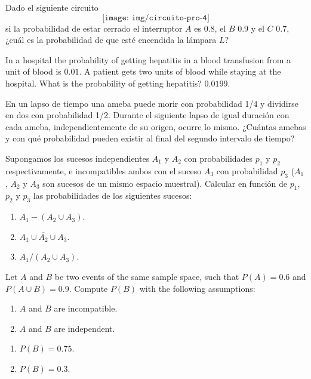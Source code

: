 {Dado el siguiente circuito
\[
\texttt{[image: img/circuito-pro-4]}
 \]
si la probabilidad de estar cerrado el interruptor $A$ es $0.8$, el $B$ $0.9$ y el $C$ $0.7$, ¿cuál es la probabilidad
de que esté encendida la lámpara $L$?
}
{}
{}


{In a hospital the probability of getting hepatitis in a blood transfusion from a unit of blood is $0.01$.
A patient gets two units of blood while staying at the hospital.
What is the probability of getting hepatitis?
}
{$0.0199$.}
{}


{En un lapso de tiempo una ameba puede morir con probabilidad 1/4 y dividirse en dos con probabilidad 1/2.
Durante el siguiente lapso de igual duración con cada ameba, independientemente de su origen, ocurre lo mismo.
¿Cuántas amebas y con qué probabilidad pueden existir al final del segundo intervalo de tiempo?
}
{}
{}


{Supongamos los sucesos independientes $A_{1}$ y $A_{2}$ con probabilidades $p_{1}$ y $p_{2}$ respectivamente, e
incompatibles ambos con el suceso $A_{3}$ con probabilidad $p_{3}$ ($A_{1}$, $A_{2}$ y $A_{3}$ son sucesos de un mismo
espacio muestral).
Calcular en función de $p_{1}$, $p_{2}$ y $p_{3}$ las probabilidades de los siguientes sucesos:
\begin{enumerate}
\item  $A_{1}-(A_{2}\cup A_{3})$.
\item  $\overline{A_{1}\cup A_{2}\cup A_{3}}$.
\item  $A_{1}/(A_{2}\cup A_{3})$.
\end{enumerate}
}
{}
{}


{Let $A$ and $B$ be two events of the same sample space, such that $P(A)=0.6$ and $P(A\cup B)=0.9.$
Compute $P(B)$ with the following assumptions:
\begin{enumerate}
\item $A$ and $B$ are incompatible.
\item $A$ and $B$ are independent.
\end{enumerate}
}
{
\begin{enumerate}
\item $P(B)=0.75$.
\item $P(B)=0.3$.
\end{enumerate}
}
{}


